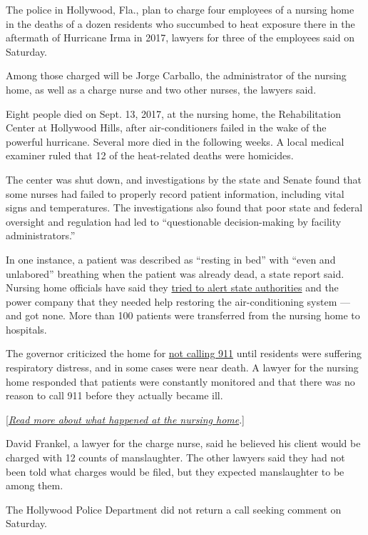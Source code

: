 The police in Hollywood, Fla., plan to charge four employees of a
nursing home in the deaths of a dozen residents who succumbed to heat
exposure there in the aftermath of Hurricane Irma in 2017, lawyers for
three of the employees said on Saturday.

Among those charged will be Jorge Carballo, the administrator of the
nursing home, as well as a charge nurse and two other nurses, the
lawyers said.

Eight people died on Sept. 13, 2017, at the nursing home, the
Rehabilitation Center at Hollywood Hills, after air-conditioners failed
in the wake of the powerful hurricane. Several more died in the
following weeks. A local medical examiner ruled that 12 of the
heat-related deaths were homicides.

The center was shut down, and investigations by the state and Senate
found that some nurses had failed to properly record patient
information, including vital signs and temperatures. The investigations
also found that poor state and federal oversight and regulation had led
to ``questionable decision-making by facility administrators.''

In one instance, a patient was described as ``resting in bed'' with
``even and unlabored'' breathing when the patient was already dead, a
state report said. Nursing home officials have said they
\href{https://www.nytimes.com/2017/09/20/us/florida-nursing-home.html}{tried
to alert state authorities} and the power company that they needed help
restoring the air-conditioning system --- and got none. More than 100
patients were transferred from the nursing home to hospitals.

The governor criticized the home for
\href{https://www.nytimes.com/2017/10/16/us/nursing-home-deaths-911.html}{not
calling 911} until residents were suffering respiratory distress, and in
some cases were near death. A lawyer for the nursing home responded that
patients were constantly monitored and that there was no reason to call
911 before they actually became ill.

{[}\href{https://www.nytimes.com/2017/09/23/us/nursing-home-deaths.html}{\emph{Read
more about what happened at the nursing home}}.{]}

David Frankel, a lawyer for the charge nurse, said he believed his
client would be charged with 12 counts of manslaughter. The other
lawyers said they had not been told what charges would be filed, but
they expected manslaughter to be among them.

The Hollywood Police Department did not return a call seeking comment on
Saturday.

